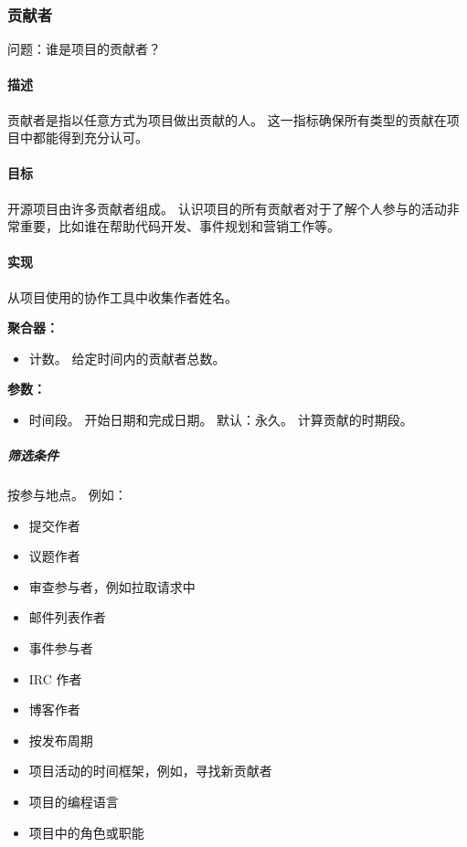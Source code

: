 \hypertarget{ux8d21ux732eux8005}{%
\subsubsection{贡献者}\label{ux8d21ux732eux8005}}

问题：谁是项目的贡献者？

\hypertarget{ux63cfux8ff0}{%
\paragraph{描述}\label{ux63cfux8ff0}}

贡献者是指以任意方式为项目做出贡献的人。
这一指标确保所有类型的贡献在项目中都能得到充分认可。

\hypertarget{ux76eeux6807}{%
\paragraph{目标}\label{ux76eeux6807}}

开源项目由许多贡献者组成。
认识项目的所有贡献者对于了解个人参与的活动非常重要，比如谁在帮助代码开发、事件规划和营销工作等。

\hypertarget{ux5b9eux73b0}{%
\paragraph{实现}\label{ux5b9eux73b0}}

从项目使用的协作工具中收集作者姓名。

\textbf{聚合器：}

\begin{itemize}
\tightlist
\item
  计数。 给定时间内的贡献者总数。
\end{itemize}

\textbf{参数：}

\begin{itemize}
\tightlist
\item
  时间段。 开始日期和完成日期。 默认：永久。 计算贡献的时期段。
\end{itemize}

\hypertarget{ux7b5bux9009ux6761ux4ef6}{%
\subparagraph{筛选条件}\label{ux7b5bux9009ux6761ux4ef6}}

按参与地点。 例如：

\begin{itemize}
\tightlist
\item
  提交作者
\item
  议题作者
\item
  审查参与者，例如拉取请求中
\item
  邮件列表作者
\item
  事件参与者
\item
  IRC 作者
\item
  博客作者
\item
  按发布周期
\item
  项目活动的时间框架，例如，寻找新贡献者
\item
  项目的编程语言
\item
  项目中的角色或职能
\end{itemize}


